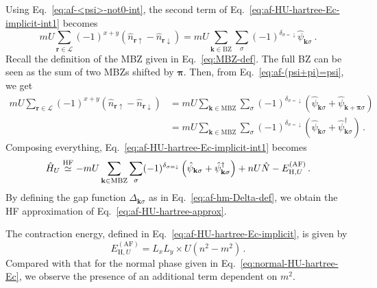 \begin{tabproof}
	Using Eq.~\eqref{eq:af-<psi>-not0-int}, the second term of Eq.~\eqref{eq:af-HU-hartree-Ec-implicit-int1} becomes
	\[
	mU \sum_{\mathbf{r}\in\mathcal{L}} (-1)^{x+y} \left(
	\hat n_{\mathbf{r}\uparrow} - \hat n_{\mathbf{r}\downarrow}
	\right) = mU \sum_{\mathbf{k} \in \mathrm{BZ}} \sum_\sigma (-1)^{\delta_{\sigma=\downarrow}} \hat \psi_{\mathbf{k}\sigma} \ .
	\]
	Recall the definition of the MBZ given in Eq.~\eqref{eq:MBZ-def}. The full BZ can be seen as the sum of two MBZs shifted by $\bm{\pi}$. Then, from Eq.~\eqref{eq:af-(psi+pi)=psi}, we get
	\[
	\begin{aligned}
		mU \sum_{\mathbf{r}\in\mathcal{L}} (-1)^{x+y} \left(
		\hat n_{\mathbf{r}\uparrow} - \hat n_{\mathbf{r}\downarrow}
		\right) &= mU \sum_{\mathbf{k} \in \mathrm{MBZ}} \sum_\sigma (-1)^{\delta_{\sigma=\downarrow}} \left(
		\hat \psi_{\mathbf{k}\sigma} + \hat \psi_{\mathbf{k}+\bm{\pi}\sigma}
		\right) \\
		&= mU \sum_{\mathbf{k} \in \mathrm{MBZ}} \sum_\sigma (-1)^{\delta_{\sigma=\downarrow}} \left(
		\hat \psi_{\mathbf{k}\sigma} + \hat \psi_{\mathbf{k}\sigma}^\dagger
		\right) \, .
	\end{aligned}
	\]
	Composing everything, Eq.~\eqref{eq:af-HU-hartree-Ec-implicit-int1} becomes
	\[
	\hat H_U \stackrel{\mathrm{HF}}{\simeq} - mU \sum_{\mathbf{k}\in\mathrm{MBZ}} \sum_\sigma (-1)^{\delta_{\sigma=\downarrow}} \left(
	\hat \psi_{\mathbf{k}\sigma} + \hat \psi_{\mathbf{k}\sigma}^\dagger
	\right) + nU \hat N - E_{\mathrm{H},U}^{(\mathrm{AF})} \, .
	\]
	By defining the gap function $\Delta_{\mathbf{k}\sigma}$ as in Eq.~\eqref{eq:af-hm-Delta-def}, we obtain the HF approximation of Eq.~\eqref{eq:af-HU-hartree-approx}.
	
\end{tabproof}

The contraction energy, defined in Eq.~\eqref{eq:af-HU-hartree-Ec-implicit}, is given by
\begin{equation}\label{eq:af-HU-hartree-Ec}
	E_{\mathrm{H},U}^{(\mathrm{AF})} = L_x L_y \times U \left(
	n^2 - m^2
	\right) \, .
\end{equation}
Compared with that for the normal phase given in Eq.~\eqref{eq:normal-HU-hartree-Ec}, we observe the presence of an additional term dependent on $m^2$.

